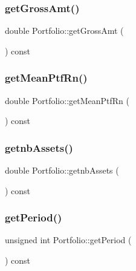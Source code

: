\subsubsection{\texorpdfstring{get\+Gross\+Amt()}{getGrossAmt()}}
{\footnotesize\ttfamily double Portfolio\+::get\+Gross\+Amt (\begin{DoxyParamCaption}{ }\end{DoxyParamCaption}) const\hspace{0.3cm}{\ttfamily [inline]}}

\hypertarget{classPortfolio_a391b4742d7394009c34e9c9e4addc35e}{}\label{classPortfolio_a391b4742d7394009c34e9c9e4addc35e} 
\subsubsection{\texorpdfstring{get\+Mean\+Ptf\+Rn()}{getMeanPtfRn()}}
{\footnotesize\ttfamily double Portfolio\+::get\+Mean\+Ptf\+Rn (\begin{DoxyParamCaption}{ }\end{DoxyParamCaption}) const\hspace{0.3cm}{\ttfamily [inline]}}

\hypertarget{classPortfolio_a165529ad0f08f24081e3bca8b354e217}{}\label{classPortfolio_a165529ad0f08f24081e3bca8b354e217} 
\subsubsection{\texorpdfstring{getnb\+Assets()}{getnbAssets()}}
{\footnotesize\ttfamily double Portfolio\+::getnb\+Assets (\begin{DoxyParamCaption}{ }\end{DoxyParamCaption}) const\hspace{0.3cm}{\ttfamily [inline]}}

\hypertarget{classPortfolio_a86ea8204e8ba0c9dd69c0fd3ba4abb16}{}\label{classPortfolio_a86ea8204e8ba0c9dd69c0fd3ba4abb16} 
\subsubsection{\texorpdfstring{get\+Period()}{getPeriod()}}
{\footnotesize\ttfamily unsigned int Portfolio\+::get\+Period (\begin{DoxyParamCaption}{ }\end{DoxyParamCaption}) const\hspace{0.3cm}{\ttfamily [inline]}}

